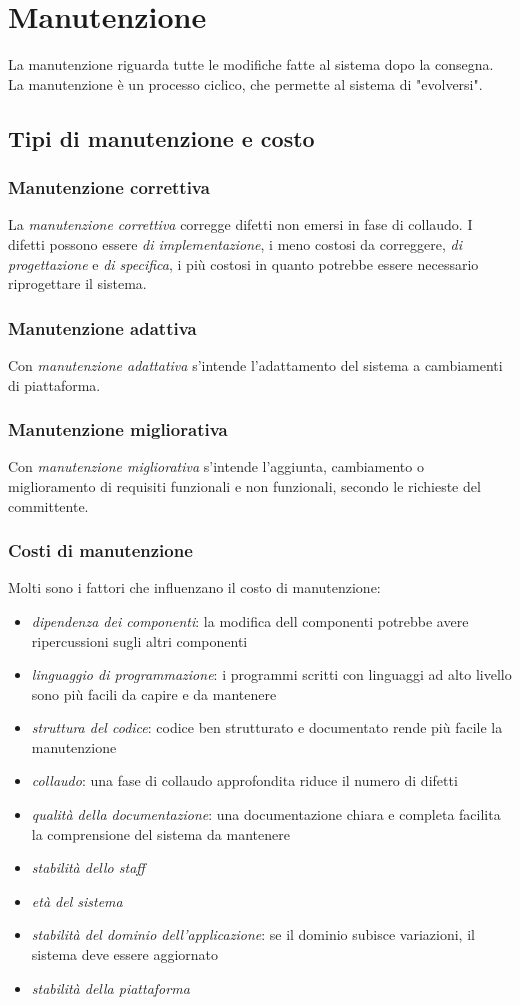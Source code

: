 \documentclass[11pt]{article}
\begin{document}
\section{Manutenzione}
La manutenzione riguarda tutte le modifiche fatte al sistema dopo la consegna. La manutenzione è un processo ciclico, che 
permette al sistema di "evolversi".
\subsection{Tipi di manutenzione e costo}
\subsubsection*{Manutenzione correttiva}
La \textit{manutenzione correttiva} corregge difetti non emersi in fase di collaudo. I difetti possono essere \textit{di 
implementazione}, i meno costosi da correggere, \textit{di progettazione} e \textit{di specifica}, i più costosi in quanto 
potrebbe essere necessario riprogettare il sistema.
\subsubsection*{Manutenzione adattiva}
Con \textit{manutenzione adattativa} s'intende l'adattamento del sistema a cambiamenti di piattaforma.
\subsubsection*{Manutenzione migliorativa}
Con \textit{manutenzione migliorativa} s'intende l'aggiunta, cambiamento o miglioramento di requisiti funzionali e non 
funzionali, secondo le richieste del committente.
\subsubsection*{Costi di manutenzione}
Molti sono i fattori che influenzano il costo di manutenzione: 
\begin{itemize}
    \item \textit{dipendenza dei componenti}: la modifica dell componenti potrebbe avere ripercussioni sugli altri componenti 
    \item \textit{linguaggio di programmazione}: i programmi scritti con linguaggi ad alto livello sono più facili da capire 
    e da mantenere
    \item \textit{struttura del codice}: codice ben strutturato e documentato rende più facile la manutenzione
    \item \textit{collaudo}: una fase di collaudo approfondita riduce il numero di difetti 
    \item \textit{qualità della documentazione}: una documentazione chiara e completa facilita la comprensione del sistema 
    da mantenere 
    \item \textit{stabilità dello staff}
    \item \textit{età del sistema}
    \item \textit{stabilità del dominio dell'applicazione}: se il dominio subisce variazioni, il sistema deve essere aggiornato
    \item \textit{stabilità della piattaforma}
\end{itemize}
\end{document}
